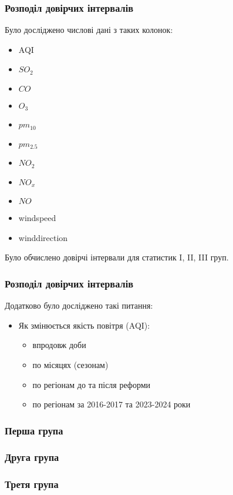 \documentclass{beamer}
\begin{document}
\begin{frame}
  \frametitle{Розподіл довірчих інтервалів}
  Було досліджено числові дані з таких колонок:
  \begin{multicols}{2}
    \begin{itemize}
        \item AQI
        \item $SO_2$
        \item $CO$
        \item $O_3$
        \item $pm_{10}$
        \item $pm_{2.5}$
        \item $NO_2$
        \item $NO_x$
        \item $NO$
        \item windspeed
        \item winddirection
    \end{itemize}
    \end{multicols} 
  Було обчислено довірчі інтервали для статистик I, II, III груп.
\end{frame}  

\begin{frame}
  \frametitle{Розподіл довірчих інтервалів}
  Додатково було досліджено такі питання:
  \begin{itemize}
    \item Як змінюється якість повітря (AQI): 
    \begin{itemize}
        \item впродовж доби
        \item по місяцях (сезонам)
        \item по регіонам до та після реформи
        \item по регіонам за 2016-2017 та 2023-2024 роки
    \end{itemize}
  \end{itemize}
  
\end{frame}

\begin{frame}
  \frametitle{Перша група}

  
\end{frame}

\begin{frame}
  \frametitle{Друга група}

  
\end{frame}

\begin{frame}
  \frametitle{Третя група}

  
\end{frame}
\end{document}
